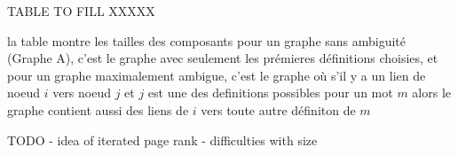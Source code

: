 TABLE TO FILL XXXXX

la table montre les tailles des composants pour un graphe sans ambiguité
(Graphe A), c'est le graphe avec seulement les prémieres définitions
choisies, et pour un graphe maximalement ambigue, c'est le graphe
où s'il y a un lien de noeud $i$ vers noeud $j$ et $j$ est une des
definitions possibles pour un mot $m$ alors le graphe contient aussi des
liens de $i$ vers toute autre définiton de $m$

TODO
- idea of iterated page rank
- difficulties with size
